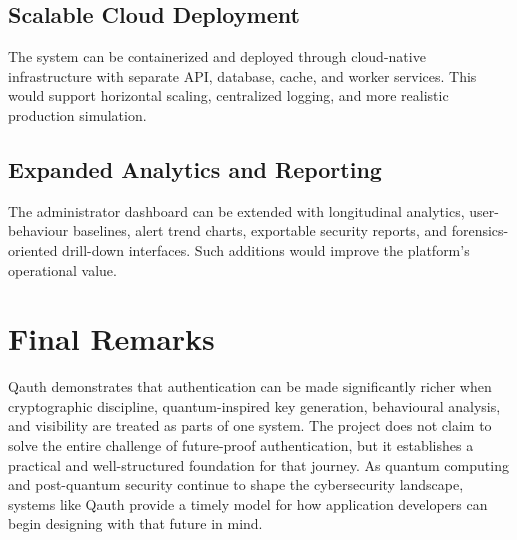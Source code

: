 \subsection{Scalable Cloud Deployment}
The system can be containerized and deployed through cloud-native infrastructure with separate API, database, cache, and worker services. This would support horizontal scaling, centralized logging, and more realistic production simulation.

\subsection{Expanded Analytics and Reporting}
The administrator dashboard can be extended with longitudinal analytics, user-behaviour baselines, alert trend charts, exportable security reports, and forensics-oriented drill-down interfaces. Such additions would improve the platform's operational value.

\section{Final Remarks}
Qauth demonstrates that authentication can be made significantly richer when cryptographic discipline, quantum-inspired key generation, behavioural analysis, and visibility are treated as parts of one system. The project does not claim to solve the entire challenge of future-proof authentication, but it establishes a practical and well-structured foundation for that journey. As quantum computing and post-quantum security continue to shape the cybersecurity landscape, systems like Qauth provide a timely model for how application developers can begin designing with that future in mind.
